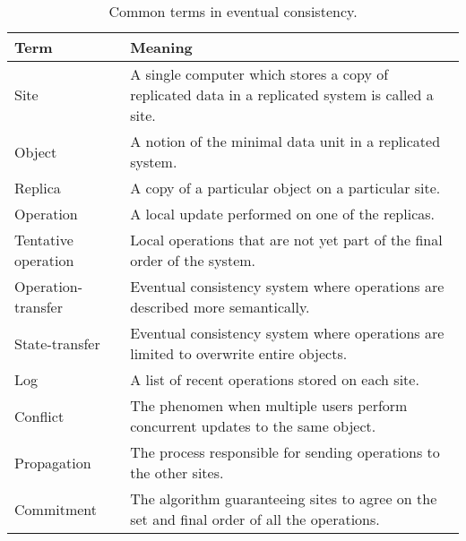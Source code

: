 \documentclass[a4paper,12pt]{report}
\begin{document}
\begin{table}
    \small
	\centering
    \begin{tabular}{l|p{}}
    	\toprule
   		Term & Meaning \\
    	\midrule
    	Site & A single computer which stores a copy of replicated data in a replicated system is called a site. \\
    	Object & A notion of the minimal data unit in a replicated system. \\
    	Replica & A copy of a particular object on a particular site. \\
        Operation & A local update performed on one of the replicas. \\
        Tentative operation & Local operations that are not yet part of the final order of the system. \\
        Operation-transfer & Eventual consistency system where operations are described more semantically. \\
        State-transfer & Eventual consistency system where operations are limited to overwrite entire objects. \\
        Log & A list of recent operations stored on each site. \\
        Conflict & The phenomen when multiple users perform concurrent updates to the same object. \\
        Propagation & The process responsible for sending operations to the other sites. \\
        Commitment & The algorithm guaranteeing sites to agree on the set and final order of all the operations. \\
    	\bottomrule
    \end{tabular}
    \caption{Common terms in eventual consistency.}
\end{table}
\end{document}
